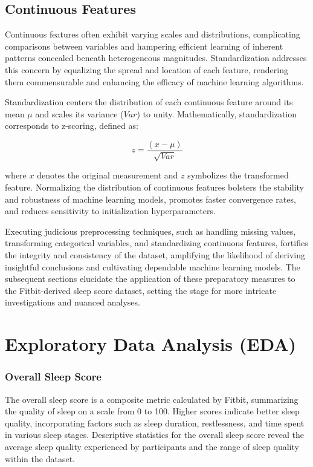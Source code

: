 \documentclass[10pt]{extarticle}
\begin{document}
\subsection{Continuous Features}

Continuous features often exhibit varying scales and distributions, complicating comparisons between variables and hampering efficient learning of inherent patterns concealed beneath heterogeneous magnitudes. Standardization addresses this concern by equalizing the spread and location of each feature, rendering them commensurable and enhancing the efficacy of machine learning algorithms.

Standardization centers the distribution of each continuous feature around its mean \(\mu{}\) and scales its variance (\(Var\)) to unity. Mathematically, standardization corresponds to z-scoring, defined as:

\[
z = \frac{(x - \mu)}{\sqrt{Var}}
\]

where \(x\) denotes the original measurement and \(z\) symbolizes the transformed feature. Normalizing the distribution of continuous features bolsters the stability and robustness of machine learning models, promotes faster convergence rates, and reduces sensitivity to initialization hyperparameters.

Executing judicious preprocessing techniques, such as handling missing values, transforming categorical variables, and standardizing continuous features, fortifies the integrity and consistency of the dataset, amplifying the likelihood of deriving insightful conclusions and cultivating dependable machine learning models. The subsequent sections elucidate the application of these preparatory measures to the Fitbit-derived sleep score dataset, setting the stage for more intricate investigations and nuanced analyses.

\section{Exploratory Data Analysis (EDA)}

\subsubsection{Overall Sleep Score}

The overall sleep score is a composite metric calculated by Fitbit, summarizing the quality of sleep on a scale from 0 to 100. Higher scores indicate better sleep quality, incorporating factors such as sleep duration, restlessness, and time spent in various sleep stages. Descriptive statistics for the overall sleep score reveal the average sleep quality experienced by participants and the range of sleep quality within the dataset.
\end{document}
